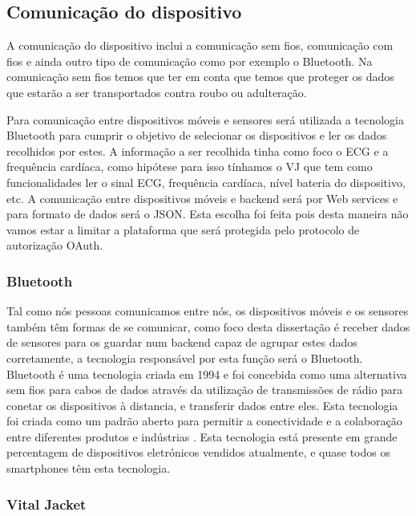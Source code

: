 \documentclass[11pt,twoside,a4paper]{report}
\begin{document}
\subsection{Comunicação do dispositivo}


A comunicação do dispositivo inclui a comunicação sem fios, comunicação com fios e ainda outro tipo de comunicação como por exemplo o Bluetooth. Na comunicação sem fios temos que ter em conta que temos que proteger os dados que estarão a ser transportados contra roubo ou adulteração. 
\par
Para comunicação entre dispositivos móveis e sensores será utilizada a tecnologia Bluetooth para cumprir o objetivo de selecionar os dispositivos e ler os dados recolhidos por estes.
A informação a ser recolhida tinha como foco o \gls{ECG} e a frequência cardíaca, como hipótese para isso tínhamos o \gls{VJ} que tem como funcionalidades ler o sinal \gls{ECG}, frequência cardíaca, nível bateria do dispositivo, etc.
A comunicação entre dispositivos móveis e backend será por Web services e para formato de dados será o JSON. Esta escolha foi feita pois desta maneira não vamos estar a limitar a plataforma que será protegida pelo protocolo de autorização OAuth. 

\subsubsection{Bluetooth}

Tal como nós pessoas comunicamos entre nós, os dispositivos móveis e os sensores também têm formas de se comunicar, como foco desta dissertação é receber dados de sensores para os guardar num backend capaz de agrupar estes dados corretamente, a tecnologia responsável por esta função será o Bluetooth.
Bluetooth é uma tecnologia criada em 1994 e foi concebida como uma alternativa sem fios para cabos de dados através da utilização de transmissões de rádio para conetar os dispositivos à distancia, e transferir dados entre eles. Esta tecnologia foi criada como um padrão aberto para permitir a conectividade e a colaboração entre diferentes produtos e indústrias \cite{bluetooth}.
Esta tecnologia está presente em grande percentagem de dispositivos eletrónicos vendidos atualmente, e quase todos os smartphones têm esta tecnologia.

\subsubsection{Vital Jacket}
\end{document}

